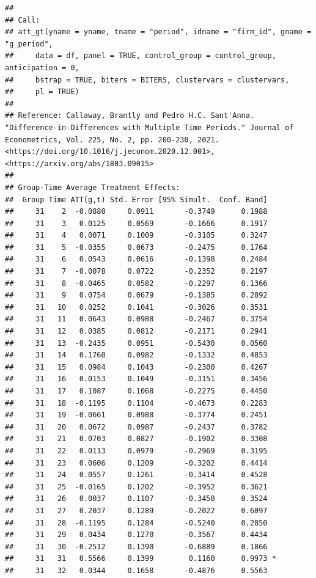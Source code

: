 \documentclass[
]{article}
\begin{document}
\begin{verbatim}
## 
## Call:
## att_gt(yname = yname, tname = "period", idname = "firm_id", gname = "g_period", 
##     data = df, panel = TRUE, control_group = control_group, anticipation = 0, 
##     bstrap = TRUE, biters = BITERS, clustervars = clustervars, 
##     pl = TRUE)
## 
## Reference: Callaway, Brantly and Pedro H.C. Sant'Anna.  "Difference-in-Differences with Multiple Time Periods." Journal of Econometrics, Vol. 225, No. 2, pp. 200-230, 2021. <https://doi.org/10.1016/j.jeconom.2020.12.001>, <https://arxiv.org/abs/1803.09015> 
## 
## Group-Time Average Treatment Effects:
##  Group Time ATT(g,t) Std. Error [95% Simult.  Conf. Band]  
##     31    2  -0.0880     0.0911       -0.3749      0.1988  
##     31    3   0.0125     0.0569       -0.1666      0.1917  
##     31    4   0.0071     0.1009       -0.3105      0.3247  
##     31    5  -0.0355     0.0673       -0.2475      0.1764  
##     31    6   0.0543     0.0616       -0.1398      0.2484  
##     31    7  -0.0078     0.0722       -0.2352      0.2197  
##     31    8  -0.0465     0.0582       -0.2297      0.1366  
##     31    9   0.0754     0.0679       -0.1385      0.2892  
##     31   10   0.0252     0.1041       -0.3026      0.3531  
##     31   11   0.0643     0.0988       -0.2467      0.3754  
##     31   12   0.0385     0.0812       -0.2171      0.2941  
##     31   13  -0.2435     0.0951       -0.5430      0.0560  
##     31   14   0.1760     0.0982       -0.1332      0.4853  
##     31   15   0.0984     0.1043       -0.2300      0.4267  
##     31   16   0.0153     0.1049       -0.3151      0.3456  
##     31   17   0.1087     0.1068       -0.2275      0.4450  
##     31   18  -0.1195     0.1104       -0.4673      0.2283  
##     31   19  -0.0661     0.0988       -0.3774      0.2451  
##     31   20   0.0672     0.0987       -0.2437      0.3782  
##     31   21   0.0703     0.0827       -0.1902      0.3308  
##     31   22   0.0113     0.0979       -0.2969      0.3195  
##     31   23   0.0606     0.1209       -0.3202      0.4414  
##     31   24   0.0557     0.1261       -0.3414      0.4528  
##     31   25  -0.0165     0.1202       -0.3952      0.3621  
##     31   26   0.0037     0.1107       -0.3450      0.3524  
##     31   27   0.2037     0.1289       -0.2022      0.6097  
##     31   28  -0.1195     0.1284       -0.5240      0.2850  
##     31   29   0.0434     0.1270       -0.3567      0.4434  
##     31   30  -0.2512     0.1390       -0.6889      0.1866  
##     31   31   0.5566     0.1399        0.1160      0.9973 *
##     31   32   0.0344     0.1658       -0.4876      0.5563  

\end{verbatim}
\end{document}

